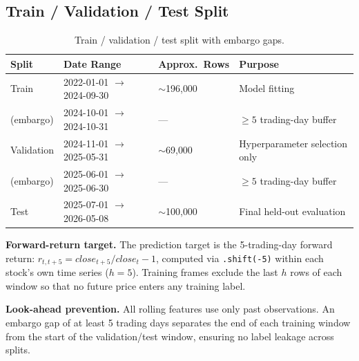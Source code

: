 \documentclass[11pt,a4paper]{article}
\begin{document}
\subsection{Train / Validation / Test Split}

\begin{table}[h]
\centering
\begin{tabular}{llll}
\toprule
Split & Date Range & Approx.\ Rows & Purpose \\
\midrule
Train     & 2022-01-01 $\to$ 2024-09-30 & $\sim$196{,}000 & Model fitting \\
(embargo) & 2024-10-01 $\to$ 2024-10-31 & ---             & $\geq 5$ trading-day buffer \\
Validation& 2024-11-01 $\to$ 2025-05-31 & $\sim$69{,}000  & Hyperparameter selection only \\
(embargo) & 2025-06-01 $\to$ 2025-06-30 & ---             & $\geq 5$ trading-day buffer \\
Test      & 2025-07-01 $\to$ 2026-05-08 & $\sim$100{,}000 & Final held-out evaluation \\
\bottomrule
\end{tabular}
\caption{Train / validation / test split with embargo gaps.}
\end{table}

\textbf{Forward-return target.} The prediction target is the 5-trading-day
forward return: $r_{t,t+5} = close_{t+5}/close_t - 1$, computed via
\texttt{.shift(-5)} within each stock's own time series ($h = 5$).
Training frames exclude the last $h$ rows of each window so that no future
price enters any training label.

\textbf{Look-ahead prevention.} All rolling features use only past
observations. An embargo gap of at least 5 trading days separates the end
of each training window from the start of the validation/test window,
ensuring no label leakage across splits.
\end{document}
